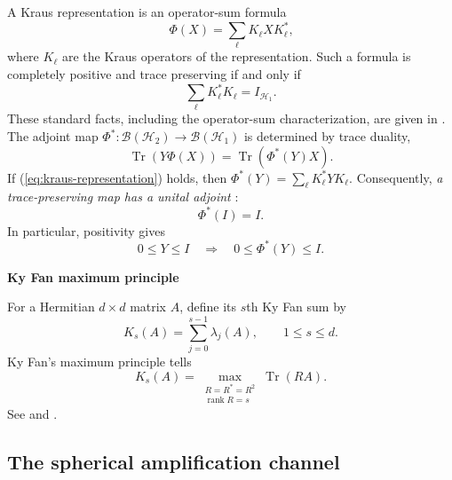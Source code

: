 \documentclass[12pt]{amsart}
\theoremstyle{plain}
\theoremstyle{definition}
\theoremstyle{remark}
\numberwithin{equation}{section}
\newcommand{\func}[1]{\operatorname{#1}}
\newcommand{\1}{\mathbf 1}
\begin{document}
A Kraus representation is an operator-sum formula 
\begin{equation}
\Phi (X)=\sum_{\ell }K_{\ell }XK_{\ell }^{\ast }\text{,}
\label{eq:kraus-representation}
\end{equation}%
where $K_{\ell }$ are the Kraus operators of the representation. Such a
formula is completely positive and trace preserving if and only if 
\begin{equation}
\sum_{\ell }K_{\ell }^{\ast }K_{\ell }=I_{\mathcal{H}_{1}}.
\label{eq:kraus-trace-preserving}
\end{equation}%
These standard facts, including the operator-sum characterization, are given
in \cite[Theorems~2.1--2.2, pp.~15--16; Section~7.1, pp.~91--92]{Petz}. The
adjoint map $\Phi ^{\ast }:\mathcal{B}(\mathcal{H}_{2})\rightarrow \mathcal{B%
}(\mathcal{H}_{1})$ is determined by trace duality, 
\begin{equation}
\func{Tr}\left( Y\Phi (X)\right) =\func{Tr}\left( \Phi ^{\ast }(Y)X\right) .
\label{eq:adjoint-definition}
\end{equation}%
If (\ref{eq:kraus-representation}) holds, then $\Phi ^{\ast }(Y)=\sum_{\ell
}K_{\ell }^{\ast }YK_{\ell }$. Consequently, \emph{a trace-preserving map
has a unital adjoint }\cite[Section 3.5]{Trevisan}:%
\begin{equation*}
\Phi ^{\ast }(I)=I.
\end{equation*}
In particular, positivity gives 
\begin{equation}
0\leq Y\leq I\quad \Longrightarrow \quad 0\leq \Phi ^{\ast }(Y)\leq I.
\label{eq:adjoint-contraction}
\end{equation}

\textbf{Ky Fan maximum principle}

For a Hermitian $d\times d$ matrix $A$, define its $s$th Ky Fan sum by 
\begin{equation}
K_{s}(A)=\sum_{j=0}^{s-1}\lambda _{j}(A),\qquad 1\leq s\leq d.
\label{eq:kyfan-sum}
\end{equation}%
Ky Fan's maximum principle tells 
\begin{equation}
K_{s}(A)=\max_{\substack{ R=R^{\ast }=R^{2} \\ \func{rank}R=s}}\func{Tr}(RA).
\label{eq:kyfan-principle}
\end{equation}%
See \cite[Theorem~1, formula~(4)]{Fan} and \cite[Theorem~11.13, p.~178]{Petz}%
. 

\subsection{The spherical amplification channel}
\end{document}
